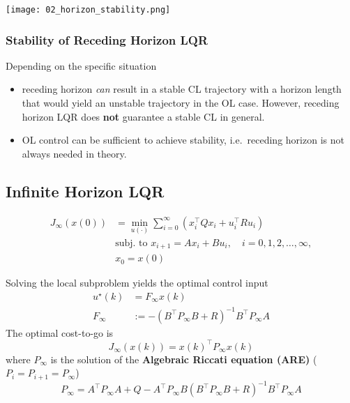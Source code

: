 \begin{center}
    \texttt{[image: 02\_horizon\_stability.png]}
\end{center}

\subsubsection{Stability of Receding Horizon LQR}

Depending on the specific situation
\begin{itemize}
    \item receding horizon \textit{can} result in a stable CL trajectory with a horizon length that would yield an unstable trajectory in the OL case. However, receding horizon LQR does \textbf{not} guarantee a stable CL in general.
    \item OL control can be sufficient to achieve stability, i.e.\ receding horizon is not always needed in theory.
\end{itemize}

\subsection{Infinite Horizon LQR}

\begin{align*}
    J_\infty(x(0)) & =\min_{u(\cdot)}\sum_{i=0}^\infty\left(x_i^\top Qx_i+u_i^\top Ru_i\right) \\
                   & \text{subj.\ to }x_{i+1}=Ax_i+Bu_i,\quad i=0,1,2,\dots,\infty,            \\
                   & x_0=x(0)
\end{align*}

\newpar{}

Solving the local subproblem yields the optimal control input
\begin{align*}
    u^\star(k) & = F_\infty x(k)                                   \\
    F_\infty   & := -{(B^\top P_\infty B+R)}^{-1}B^\top P_\infty A
\end{align*}
The optimal cost-to-go is
\begin{equation*}
    J_\infty(x(k))={x(k)}^\top P_\infty x(k)
\end{equation*}
where $P_\infty$ is the solution of the \textbf{Algebraic Riccati equation (ARE)} ($P_i = P_{i+1} = P_{\infty}$)
\begin{equation*}
    P_\infty=A^\top P_\infty A+Q-A^\top P_\infty B{(B^\top P_\infty B+R)}^{-1}B^\top P_\infty A
\end{equation*}



